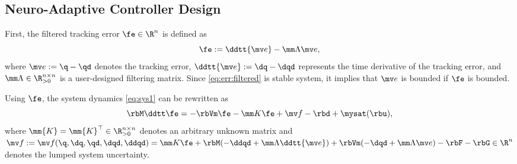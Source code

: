 \documentclass[lettersize,journal]{IEEEtran}
\begin{document}
\subsection{Neuro-Adaptive Controller Design}\label{sec:sub:NAC}

First, the filtered tracking error $\fe\in\R^n$ is defined as 
\begin{equation}
    \fe := \ddtt{\mv e}-\mm\Lambda \mv e
    ,
    \label{eq:err:filtered}
\end{equation}
where $\mv e := \q - \qd$ denotes the tracking error, $\ddtt{\mv e} := \dq - \dqd$ represents the time derivative of the tracking error, and $\mm\Lambda\in\R^{n\times n}_{>0}$ is a user-designed filtering matrix.
Since \eqref{eq:err:filtered} is stable system, it implies that $\mv e$ is bounded if $\fe$ is bounded.

Using $\fe$, the system dynamics \eqref{eq:sys1} can be rewritten as
\begin{equation}
    \rbM \ddtt\fe
    =
    -\rbVm \fe
    -\mm K \fe
    + \mv f
    -\rbd + \mysat(\rbu)
    ,
    \label{eq:sys:filtered}
\end{equation}
where $\mm{K}=\mm{K}^\top\in\R^{n\times n}_{>0}$ denotes an arbitrary unknown matrix and $
    \mv f:= \mv f(\q,\dq,\qd,\dqd,\ddqd)
    =
    \mm K \fe
    +\rbM(-\ddqd+\mm\Lambda\ddtt{\mv e})
    +
    \rbVm(-\dqd+\mm\Lambda\mv e)
    -
    \rbF
    -
    \rbG
    \in\R^n
$ denotes the lumped system uncertainty.
\end{document}
